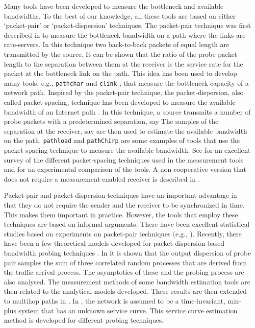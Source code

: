 \documentclass[11pt]{article}
\begin{document}
Many tools have been developed to measure the bottleneck and available
bandwidths. To the best of our knowledge, all these tools are based on
either `packet-pair' or `packet-dispersion' techniques.  The
packet-pair technique was first described in \cite{Keshav91} to
measure the bottleneck bandwidth on a path where the links are
rate-servers. In this technique two back-to-back packets of equal
length are transmitted by the source.  It can be shown that the ratio
of the probe packet length to the separation between them at the
receiver is the service rate for the packet at the bottleneck link on
the path.  This idea has been used to develop many tools, e.g.,
\texttt{pathchar} \cite{Jacobson97} and \texttt{clink}
\cite{Downey99}, that measure the bottleneck capacity of a network
path. Inspired by the packet-pair technique, the packet-dispersion,
also called packet-spacing, technique has been developed to measure
the available bandwidth of an Internet path
\cite{Jain02,Rebeiro03,Prasad03,Strauss03,Chakraborty05}. In this
technique, a source transmits a number of probe packets with a
predetermined separation, say  The samples of the separation at
the receiver, say  are then used to estimate the available
bandwidth on the path.  \texttt{pathload} \cite{Jain02} and
\texttt{pathChirp} \cite{Rebeiro03} are some examples of tools that
use the packet-spacing technique to measure the available bandwidth.
See \cite{Prasad03} for an excellent survey of the different
packet-spacing techniques used in the measurement tools and
\cite{Strauss03} for an experimental comparison of the tools. A non
cooperative version that does not require a measurement-enabled
receiver is described in \cite{Chakraborty05}.

Packet-pair and packet-dispersion techniques have an important
advantage in that they do not require the sender and the receiver to
be synchronized in time. This makes them important in practice.
However, the tools that employ these techniques are based on informal
arguments. There have been excellent statistical studies based on
experiments on packet-pair techniques (e.g.,
\cite{Dovrolis01,Pasztor03}). Recently, there have been a few
theoretical models developed for packet dispersion based bandwidth
probing techniques
\cite{Liu05,Liu07,Liu08,Liebeherr07,Park06,Haga06,Machiraju07}. In
\cite{Liu05,Liu07} it is shown that the output dispersion of probe
pair samples the sum of three correlated random processes that are
derived from the traffic arrival process. The asymptotics of these and
the probing process are also analysed. The measurement methods of some
bandwidth estimation tools are then related to the analytical models
developed. These results are then extended to multihop paths in
\cite{Liu08}. In \cite{Liebeherr07}, the network is assumed to be a
time-invariant, min-plus system that has an unknown service
curve. This service curve estimation method is developed for different
probing techniques. 
\end{document}
